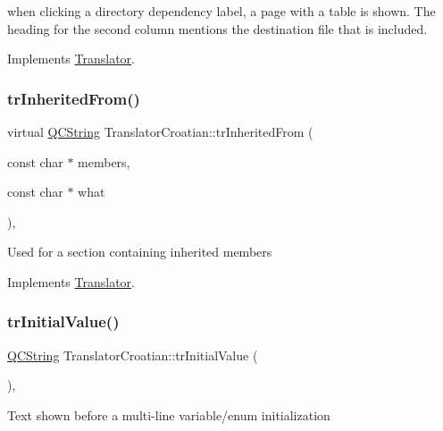 when clicking a directory dependency label, a page with a table is shown. The heading for the second column mentions the destination file that is included. 

Implements \mbox{\hyperlink{class_translator}{Translator}}.

\mbox{\label{class_translator_croatian_a6276e8ba64d64b3112350b3266341cf4}} 
\subsubsection{\texorpdfstring{trInheritedFrom()}{trInheritedFrom()}}
{\footnotesize\ttfamily virtual \mbox{\hyperlink{class_q_c_string}{Q\+C\+String}} Translator\+Croatian\+::tr\+Inherited\+From (\begin{DoxyParamCaption}\item[{const char $\ast$}]{members,  }\item[{const char $\ast$}]{what }\end{DoxyParamCaption})\hspace{0.3cm}{\ttfamily [inline]}, {\ttfamily [virtual]}}

Used for a section containing inherited members 

Implements \mbox{\hyperlink{class_translator}{Translator}}.

\mbox{\label{class_translator_croatian_a6a8d2d0c029a69806569389ea76e9413}} 
\subsubsection{\texorpdfstring{trInitialValue()}{trInitialValue()}}
{\footnotesize\ttfamily \mbox{\hyperlink{class_q_c_string}{Q\+C\+String}} Translator\+Croatian\+::tr\+Initial\+Value (\begin{DoxyParamCaption}{ }\end{DoxyParamCaption})\hspace{0.3cm}{\ttfamily [inline]}, {\ttfamily [virtual]}}

Text shown before a multi-\/line variable/enum initialization 

